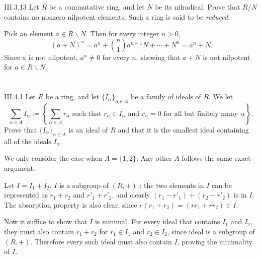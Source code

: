 \begin{problem}{III.3.13}
Let $R$ be a commutative ring, and let $N$ be its nilradical. Prove that $R/N$ contains no nonzero nilpotent elements. Such a ring is said to be \emph{reduced}.
\end{problem}
\begin{pf}
Pick an element $a \in R \backslash N$. Then for every integer $n > 0$, 
\[
(a + N)^n = a^n + \binom{n}{1} a^{n-1} N + \cdots + N^n = a^n + N
\]
Since $a$ is not nilpotent, $a^n \neq 0$ for every $n$, showing that $a + N$ is not nilpotent for $a \in R \backslash N$.
\end{pf}

\section{}
\begin{problem}{III.4.1}
Let $R$ be a ring, and let $\{I_\alpha\}_{\alpha \in A}$ be a family of ideals of $R$. We let 
\[
\sum_{\alpha \in A} I_\alpha := \left\{ \sum_{\alpha \in A}r_\alpha \text{ such that } r_\alpha \in I_\alpha \text{ and } r_\alpha = 0 \text{ for all but finitely many } \alpha \right\}.  
\]
Prove that $\{I_\alpha\}_{\alpha \in A}$ is an ideal of $R$ and that it is the smallest ideal containing all of the ideals $I_\alpha$.
\end{problem}
\begin{pf}
We only consider the case when $A = \{1,2\}$: Any other $A$ follows the same exact argument. 

Let $I = I_1 + I_2$. $I$ is a subgroup of $(R,+)$ : the two elements in $I$ can be represented as $r_1 + r_2$ and $r'_1 + r'_2$, and clearly $(r_1 - r'_1) + (r_2 - r'_2)$ is in $I$. The absorption property is also clear, since $r (r_1 + r_2) = (rr_1 + rr_2) \in I$. 

Now it suffice to show that $I$ is minimal. For every ideal that contains $I_1$ and $I_2$, they must also contain $r_1 + r_2$ for $r_1 \in I_1$ and $r_2 \in I_2$, since ideal is a subgroup of $(R,+)$. Therefore every such ideal must also contain $I$, proving the minimality of $I$.
\end{pf}


